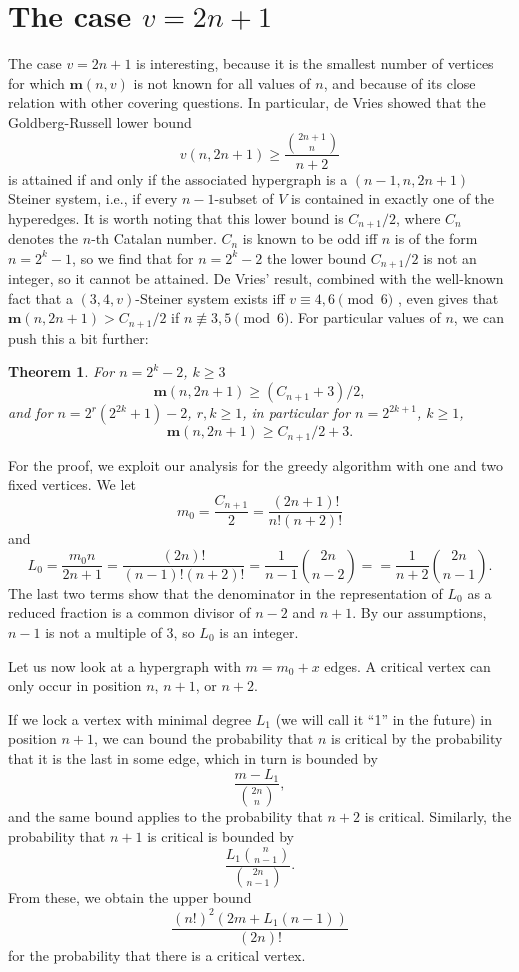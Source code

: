 \documentclass[a4paper,12pt]{article}
\newtheorem{theorem}{Theorem}
\begin{document}
\section{The case $v=2n+1$}
The case $v=2n+1$ is interesting, because it is the smallest number of
vertices for which $\mathbf m(n,v)$ is not known for all values of $n$, and
because of its close relation with other covering questions. In particular,
de Vries\cite{deVries1977} showed that the Goldberg-Russell lower bound
\[v(n,2n+1)\ge\frac{\genfrac(){0pt}1{2n+1}{n}}{n+2}\]
is attained if and only if the associated hypergraph is a $(n-1,n,2n+1)$ 
Steiner system, i.e., if every $n-1$-subset of $V$ is contained in exactly
one of the hyperedges. It is worth noting that this lower bound is
$C_{n+1}/2$, where $C_n$ denotes the $n$-th Catalan number. $C_n$ is known
to be odd iff $n$ is of the form $n=2^k-1$\cite{deutschsagan},
 so we find that for $n=2^k-2$
the lower bound $C_{n+1}/2$ is not an integer, so it cannot be attained. 
De Vries' result, combined with the well-known fact that a $(3,4,v)$-Steiner
system exists iff $v\equiv 4,6\pmod 6$ \cite{hanani}, even gives that
$\mathbf m(n,2n+1)>C_{n+1}/2$ if $n\not\equiv 3,5\pmod 6$. For particular values
of $n$, we can push this a bit further:
\begin{theorem}
For $n=2^k-2$, $k\ge 3$
\[\mathbf m(n,2n+1)\ge (C_{n+1}+3)/2,\]
and for $n=2^r(2^{2k}+1)-2$, $r,k\ge 1$, in particular 
for $n=2^{2k+1}$, $k\ge 1$,
\[\mathbf m(n,2n+1)\ge C_{n+1}/2+3.\]
\end{theorem}

For the proof, we exploit our analysis for the greedy algorithm with one and 
two fixed vertices. We let 
\[m_0=\frac{C_{n+1}}{2}=\frac{(2n+1)!}{n!(n+2)!}\]
 and 
\[L_0=\frac{m_0n}{2n+1}=\frac{(2n)!}{(n-1)!(n+2)!}
=\frac{1}{n-1}\genfrac(){0pt}1{2n}{n-2}=
=\frac{1}{n+2}\genfrac(){0pt}1{2n}{n-1}. \]
The last two terms show that the
 denominator in the representation of $L_0$ as a reduced fraction is a 
common divisor of $n-2$ and $n+1$. By our assumptions, $n-1$ is not a multiple
of $3$, so $L_0$ is an integer. 

Let us now look at a hypergraph with $m=m_0+x$ edges.
A critical vertex can only occur in position $n$, $n+1$, or $n+2$. 

If we lock a vertex with minimal degree $L_1$ (we will call it ``1'' in
the future) in position $n+1$, we can 
bound the probability that $n$ is critical by the probability that it is
the last in some edge, which in turn is bounded by
\[\frac{m-L_1}{\genfrac(){0pt}1{2n}{n}},\]
and the same bound applies to the probability that $n+2$ is critical. 
Similarly, the probability that $n+1$ is critical is bounded by
\[\frac{L_1\genfrac(){0pt}1{n}{n-1}}{\genfrac(){0pt}1{2n}{n-1}}.\]
From these, we obtain the upper bound
\[\frac{ (n!)^2(2m+L_1(n-1))}{(2n)!}\]
for the probability that there is a critical vertex.
\end{document}
